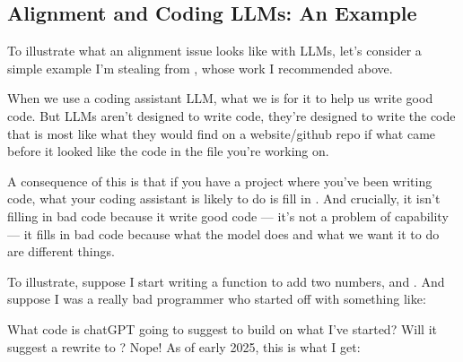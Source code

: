 \documentclass[letterpaper,10pt,english]{jupyterBook}
\begin{document}
\subsection{Alignment and Coding LLMs: An Example}
\label{\detokenize{30_questions/23_passive_internal_alignment_and_bias:alignment-and-coding-llms-an-example}}
\sphinxAtStartPar
To illustrate what an alignment issue looks like with LLMs, let’s consider a simple example I’m stealing from , whose work I recommended above.

\sphinxAtStartPar
When we use a coding assistant LLM, what we  is for it to help us write good code. But LLMs aren’t designed to write  code, they’re designed to write the code that is most like what they would find on a website/github repo if what came before it looked like the code in the file you’re working on.

\sphinxAtStartPar
A consequence of this is that if you have a project where you’ve been writing  code, what your coding assistant is likely to do is fill in . And crucially, it isn’t filling in bad code because it  write good code — it’s not a problem of capability — it fills in bad code because what the model does and what we want it to do are different things.

\sphinxAtStartPar
To illustrate, suppose I start writing a function to add two numbers,  and . And suppose I was a really bad programmer who started off with something like:

\begin{sphinxVerbatim}[commandchars=\\\{\}]
  
           
         
           
         
\end{sphinxVerbatim}

\sphinxAtStartPar
What code is chatGPT going to suggest to build on what I’ve started? Will it suggest a re\sphinxhyphen{}write to ? Nope! As of early 2025, this is what I get:
\end{document}
